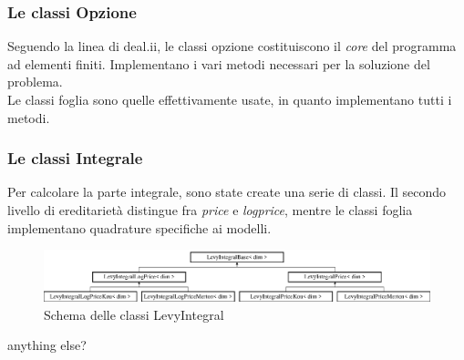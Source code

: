 \documentclass{beamer}
\begin{document}

\begin{frame}[t]
 \frametitle{Le classi Opzione}

 Seguendo la linea di \textsf{deal.ii}, le classi opzione costituiscono il \emph{core} del programma ad elementi finiti. Implementano i vari metodi necessari per la soluzione del problema.\\ Le classi foglia sono quelle effettivamente usate, in quanto implementano tutti i metodi.
\end{frame}



\begin{frame}[t]
 \frametitle{Le classi Integrale}
 Per calcolare la parte integrale, sono state create una serie di classi. Il secondo livello di ereditarietà distingue fra \emph{price} e \emph{logprice}, mentre le classi foglia implementano quadrature specifiche ai modelli.

 \begin{figure}
  \centering
  \includegraphics[width=\linewidth]{classLevyIntegralBase}
 \caption{Schema delle classi LevyIntegral}
 \end{figure}
 \pause
 \begin{block}{anything else?}

 \end{block}
\end{frame}
\end{document}

